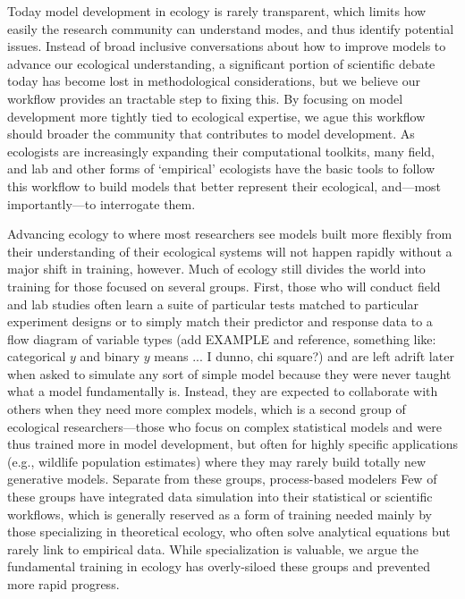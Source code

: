 \documentclass[11pt]{article}
\begin{document}
Today model development in ecology is rarely transparent, which limits how easily the research community can understand modes, and thus identify potential issues. Instead of broad inclusive conversations about how to improve models to advance our ecological understanding, a significant portion of scientific debate today has become lost in methodological considerations, but we believe our workflow provides an tractable step to fixing this. By focusing on model development more tightly tied to ecological expertise, we ague this workflow should broader the community that contributes to model development. As ecologists are increasingly expanding their computational toolkits, many field, and lab and other forms of `empirical' ecologists have the basic tools to follow this workflow to build models that better represent their ecological, and---most importantly---to interrogate them.

Advancing ecology to where most researchers see models built more flexibly from their understanding of their ecological systems will not happen rapidly without a major shift in training, however. Much of ecology still divides the world into training for those focused on several groups. First, those who will conduct field and lab studies often learn a suite of particular tests matched to particular experiment designs or to simply match their predictor and response data to a flow diagram of variable types (add EXAMPLE and reference, something like: categorical $y$ and binary $y$ means ... I dunno, chi square?) and are left adrift later when asked to simulate any sort of simple model because they were never taught what a model fundamentally is. Instead, they are expected to collaborate with others when they need more complex models, which is a second group of ecological researchers---those who focus on complex statistical models and were thus trained more in model development, but often for highly specific applications (e.g., wildlife population estimates) where they may rarely build totally new generative models. Separate from these groups, process-based modelers 
Few of these groups have integrated data simulation into their statistical or scientific workflows, which is generally reserved as a form of training needed mainly by those specializing in theoretical ecology, who often solve analytical equations but rarely link to empirical data. While specialization is valuable, we argue the fundamental training in ecology has overly-siloed these groups and prevented more rapid progress.
\end{document}
